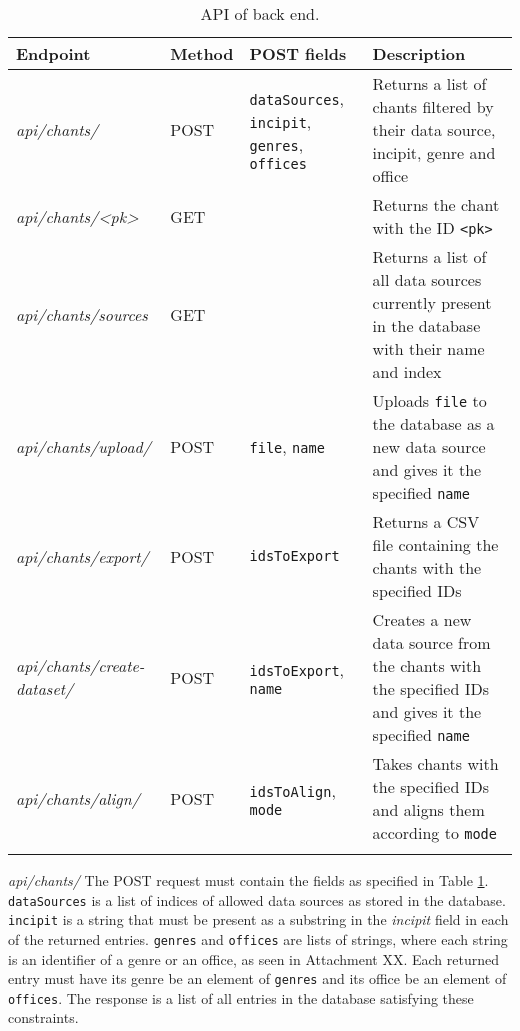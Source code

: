 \begin{longtable}{| p{} | p{} | p{} | p{} |} 

 \hline
 Endpoint & Method & POST fields & Description \\
 \hline
\emph{api/chants/}                & POST & \verb|dataSources|, \verb|incipit|, \verb|genres|, \verb|offices| & Returns a list of chants filtered by their data source, incipit, genre and office\\
\emph{api/chants/\textless pk\textgreater} & GET  &                                                          & Returns the chant with the ID \verb|<pk>|\\
\emph{api/chants/sources}         & GET  &                                                                   & Returns a list of all data sources currently present in the database with their name and index\\
\emph{api/chants/upload/}         & POST & \verb|file|, \verb|name|                                          & Uploads \verb|file| to the database as a new data source and gives it the specified \verb|name|\\
\emph{api/chants/export/}         & POST & \verb|idsToExport|                                                & Returns a CSV file containing the chants with the specified IDs\\
\emph{api/chants/create-dataset/} & POST & \verb|idsToExport|, \verb|name|                                   & Creates a new data source from the chants with the specified IDs and gives it the specified \verb|name|\\
\emph{api/chants/align/}          & POST & \verb|idsToAlign|, \verb|mode|                                    & Takes chants with the specified IDs and aligns them according to \verb|mode|\\
 \hline

\caption{API of back end.}
\label{table:api}
\end{longtable}

\emph{api/chants/} The POST request must contain the fields as specified in Table \ref{table:api}. \verb|dataSources| is a list of indices of allowed data sources as stored
in the database. \verb|incipit| is a string that must be present as a substring in the \emph{incipit} field in each of the returned entries. \verb|genres| and \verb|offices|
are lists of strings, where each string is an identifier of a genre or an office, as seen in Attachment XX. Each returned entry must have its genre be an element of \verb|genres|
and its office be an element of \verb|offices|. The response is a list of all entries in the database satisfying these constraints.

